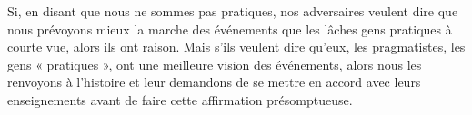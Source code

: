 Si, en disant que nous ne sommes pas pratiques, nos adversaires veulent dire que nous prévoyons mieux la marche des événements que les lâches gens pratiques à courte vue, alors ils ont raison. Mais s'ils veulent dire qu'eux, les pragmatistes, les gens « pratiques », ont une meilleure vision des événements, alors nous les renvoyons à l'histoire et leur demandons de se mettre en accord avec leurs enseignements avant de faire cette affirmation présomptueuse.

